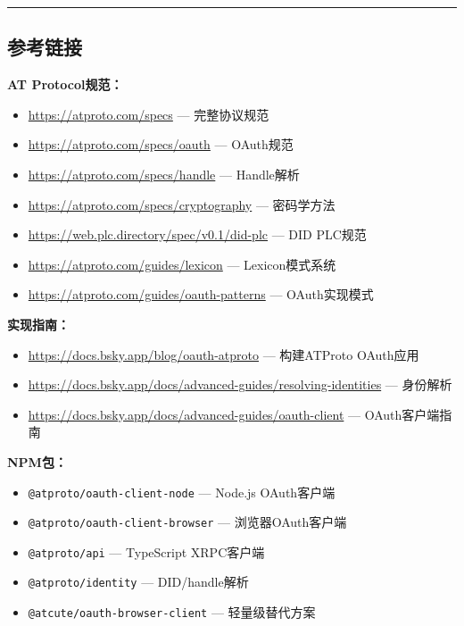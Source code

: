 \documentclass[10pt,letterpaper,twocolumn]{article}
\begin{document}

\vspace{0.5em}
\noindent\rule{\columnwidth}{0.5pt}

\subsection*{参考链接}

\noindent\small

\textbf{AT Protocol规范：}
\begin{itemize}
  \item \url{https://atproto.com/specs} --- 完整协议规范
  \item \url{https://atproto.com/specs/oauth} --- OAuth规范
  \item \url{https://atproto.com/specs/handle} --- Handle解析
  \item \url{https://atproto.com/specs/cryptography} --- 密码学方法
  \item \url{https://web.plc.directory/spec/v0.1/did-plc} --- DID PLC规范
  \item \url{https://atproto.com/guides/lexicon} --- Lexicon模式系统
  \item \url{https://atproto.com/guides/oauth-patterns} --- OAuth实现模式
\end{itemize}

\textbf{实现指南：}
\begin{itemize}
  \item \url{https://docs.bsky.app/blog/oauth-atproto} --- 构建ATProto OAuth应用
  \item \url{https://docs.bsky.app/docs/advanced-guides/resolving-identities} --- 身份解析
  \item \url{https://docs.bsky.app/docs/advanced-guides/oauth-client} --- OAuth客户端指南
\end{itemize}

\textbf{NPM包：}
\begin{itemize}
  \item \texttt{@atproto/oauth-client-node} --- Node.js OAuth客户端
  \item \texttt{@atproto/oauth-client-browser} --- 浏览器OAuth客户端
  \item \texttt{@atproto/api} --- TypeScript XRPC客户端
  \item \texttt{@atproto/identity} --- DID/handle解析
  \item \texttt{@atcute/oauth-browser-client} --- 轻量级替代方案
\end{itemize}
\end{document}
